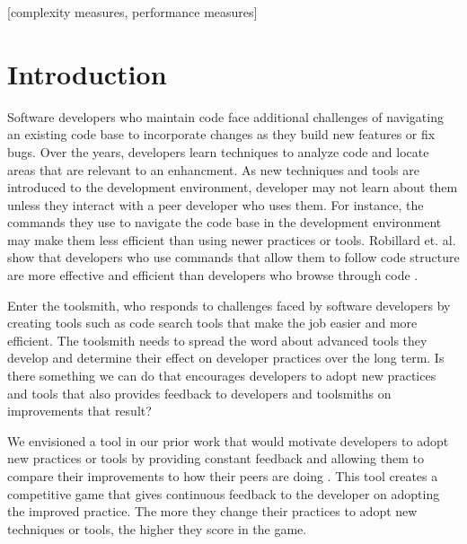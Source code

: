 \documentclass{sig-alternate}
\begin{document}
[complexity measures, performance measures]



\section{Introduction}

Software developers who maintain code face additional challenges of navigating an existing code base to incorporate changes as they build new features or fix bugs.  Over the years, developers learn techniques to analyze code and locate areas that are relevant to an enhancment.  As new techniques and tools are introduced to the development environment, developer may not learn about them unless they interact with a peer developer who uses them\cite{wbsnipes:Hill2011Peer}.    For instance, the commands they use to navigate the code base in the development environment may make them less efficient than using newer practices or tools.  Robillard et. al. show that developers who use commands that allow them to follow code structure are more effective and efficient than developers who browse through code \cite{wbsnipes:Robillard2004How}.   

Enter the toolsmith,  who responds to challenges faced by software developers by creating tools such as code search tools that make the job easier and more efficient.  The toolsmith needs to spread the word about advanced tools they develop and determine their effect on developer practices over the long term.  Is there something we can do that encourages developers to adopt new practices and tools that also provides feedback to developers and toolsmiths on improvements that result?  

We envisioned a tool in our prior work that would motivate developers to adopt new practices or tools by providing constant feedback and allowing them to compare their improvements to how their peers are doing  \cite{Snipes2013Towards}.  This tool creates a competitive game that gives continuous feedback to the developer on adopting the improved practice.  The more they change their practices to adopt new techniques or tools, the higher they score in the game. 
\end{document}
